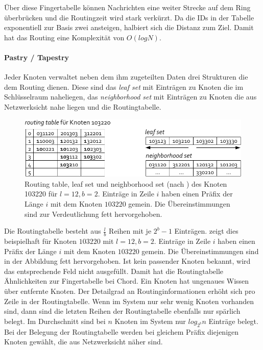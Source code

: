 Über diese Fingertabelle können Nachrichten eine weiter Strecke auf dem Ring überbrücken und die Routingzeit wird stark verkürzt. Da die IDs in der Tabelle exponentiell zur Basis zwei ansteigen, halbiert sich die Distanz zum Ziel. Damit hat das Routing eine Komplexität von $O(log N)$.

\paragraph{Pastry / Tapestry}
Jeder Knoten verwaltet neben dem ihm zugeteilten Daten drei Strukturen die dem Routing dienen. Diese sind das \emph{leaf set} mit Einträgen zu Knoten die im Schlüsselraum naheliegen, das \emph{neighborhood set} mit Einträgen zu Knoten die aus Netzwerksicht nahe liegen und die Routingtabelle.

\begin{figure}[htbp]
\centering
\includegraphics{grafics/pastry_routing_table.pdf}
\caption{Routing table, leaf set und neighborhood set (nach \cite{Goetz2005}) des Knoten 103220 für $l=12, b=2$. Einträge in Zeile $i$ haben einen Präfix der Länge $i$ mit dem Knoten $103220$ gemein. Die Übereinstimmungen sind zur Verdeutlichung fett hervorgehoben.}
\label{fig:pastry_routing_table}
\end{figure}

Die Routingtabelle besteht aus $\frac{l}{b}$ Reihen mit je $2^b -1$ Einträgen.  zeigt dies beispielhaft für Knoten $103220$ mit $l=12, b=2$. Einträge in Zeile $i$ haben einen Präfix der Länge $i$ mit dem Knoten $103220$ gemein. Die Übereinstimmungen sind in der Abbildung fett hervorgehoben. Ist kein passender Knoten bekannt, wird das entsprechende Feld nicht ausgefüllt. Damit hat die Routingtabelle Ähnlichkeiten zur Fingertabelle bei Chord. Ein Knoten hat ungenaues Wissen über entfernte Knoten. Der Detailgrad an Routinginformationen erhöht sich pro Zeile in der Routingtabelle. Wenn im System nur sehr wenig Knoten vorhanden sind, dann sind die letzten Reihen der Routingtabelle ebenfalls nur spärlich belegt. Im Durchschnitt sind bei $n$ Knoten im System nur $log_{2^b} n$ Einträge belegt.\\
Bei der Belegung der Routingtabelle werden bei gleichem Präfix diejenigen Knoten gewählt, die aus Netzwerksicht näher sind.

